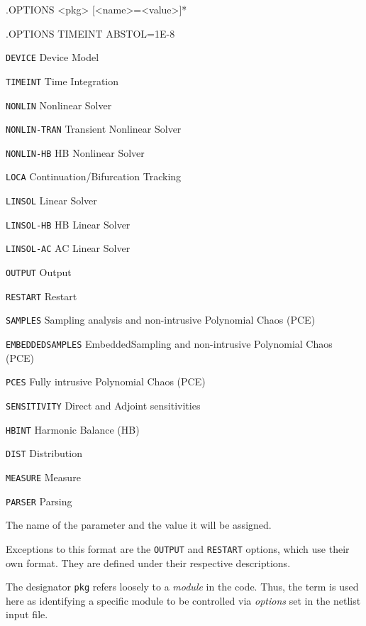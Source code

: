 \begin{Command}
\format
.OPTIONS <pkg> [<name>=<value>]*

\examples
.OPTIONS TIMEINT ABSTOL=1E-8

\arguments

\begin{Arguments}


\begin{basedescript}{
    \desclabelstyle{\multilinelabel}
    \desclabelwidth{1.5in}
    \renewcommand{\makelabel}[1]{\tt #1\hfill}}
  \item[\tt DEVICE]       Device Model
  \item[\tt TIMEINT]      Time Integration
  \item[\tt NONLIN]       Nonlinear Solver
  \item[\tt NONLIN-TRAN]  Transient Nonlinear Solver
  \item[\tt NONLIN-HB]    HB Nonlinear Solver
  \item[\tt LOCA]         Continuation/Bifurcation Tracking
  \item[\tt LINSOL]       Linear Solver
  \item[\tt LINSOL-HB]    HB Linear Solver
  \item[\tt LINSOL-AC]    AC Linear Solver
  \item[\tt OUTPUT]       Output
  \item[\tt RESTART]      Restart
  \item[\tt SAMPLES]      Sampling analysis and non-intrusive Polynomial Chaos (PCE)
  \item[\tt EMBEDDEDSAMPLES]  EmbeddedSampling and non-intrusive Polynomial Chaos (PCE) 
  \item[\tt PCES]         Fully intrusive Polynomial Chaos (PCE)
  \item[\tt SENSITIVITY]  Direct and Adjoint sensitivities
  \item[\tt HBINT]        Harmonic Balance (HB)
  \item[\tt DIST]         Distribution
  \item[\tt MEASURE]      Measure
  \item[\tt PARSER]       Parsing
\end{basedescript}

The name of the parameter and the value it will be assigned.

\end{Arguments}

\comments

Exceptions to this format are the \texttt{OUTPUT} and \texttt{RESTART}
options, which use their own format. They are defined under their
respective descriptions.

The designator \texttt{pkg} refers loosely to a {\em module} in the
code.  Thus, the term is used here as identifying a specific module to
be controlled via {\em options} set in the netlist input file.

\end{Command}

